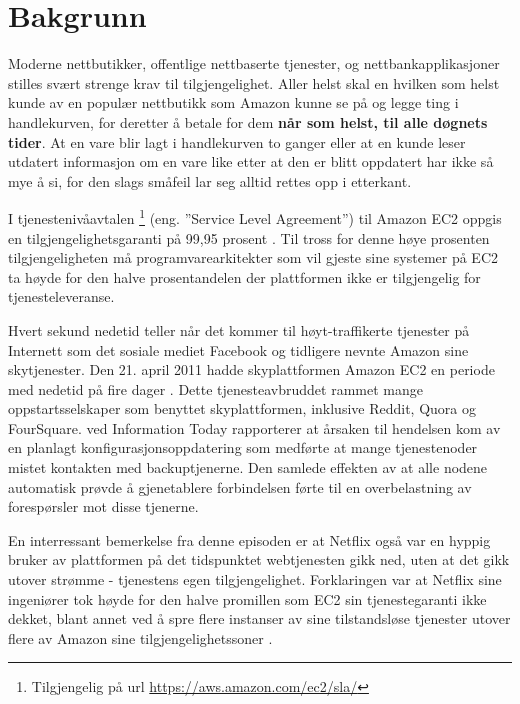 \section{Bakgrunn}

Moderne nettbutikker, offentlige nettbaserte tjenester, og nettbankapplikasjoner stilles svært strenge krav til tilgjengelighet. Aller helst skal en hvilken som helst kunde av en populær nettbutikk som Amazon kunne se på og legge ting i handlekurven, for deretter å betale for dem \textbf{når som helst, til alle døgnets tider}. At en vare blir lagt i handlekurven to ganger eller at en kunde leser utdatert informasjon om en vare like etter at den er blitt oppdatert har ikke så mye å si, for den slags småfeil lar seg alltid rettes opp i etterkant.

I tjenestenivåavtalen \footnote{Tilgjengelig på url \url{https://aws.amazon.com/ec2/sla/}} (eng. ''Service Level Agreement'') til Amazon EC2 oppgis en tilgjengelighetsgaranti på 99,95 prosent \citep{BCK2013}. Til tross for denne høye prosenten tilgjengeligheten må programvarearkitekter som vil gjeste sine systemer på EC2 ta høyde for den halve prosentandelen der plattformen ikke er tilgjengelig for tjenesteleveranse.

Hvert sekund nedetid teller når det kommer til høyt-traffikerte tjenester på Internett som det sosiale mediet Facebook og tidligere nevnte Amazon sine skytjenester. Den 21. april 2011 hadde skyplattformen Amazon EC2 en periode med nedetid på fire dager \citep{BCK2013}. Dette tjenesteavbruddet rammet mange oppstartsselskaper som benyttet skyplattformen, inklusive Reddit, Quora og FourSquare. \cite{Schiller2011} ved Information Today rapporterer at årsaken til hendelsen kom av en planlagt konfigurasjonsoppdatering som medførte at mange tjenestenoder mistet kontakten med backuptjenerne. Den samlede effekten av at alle nodene automatisk prøvde å gjenetablere forbindelsen førte til en overbelastning av forespørsler mot disse tjenerne.

En interressant bemerkelse fra denne episoden er at Netflix også var en hyppig bruker av plattformen på det tidspunktet webtjenesten gikk ned, uten at det gikk utover strømme - tjenestens egen tilgjengelighet. Forklaringen var at Netflix sine ingeniører tok høyde for den halve promillen som EC2 sin tjenestegaranti ikke dekket, blant annet ved å spre flere instanser av sine tilstandsløse tjenester utover flere av Amazon sine tilgjengelighetssoner \citep{BCK2013}.


